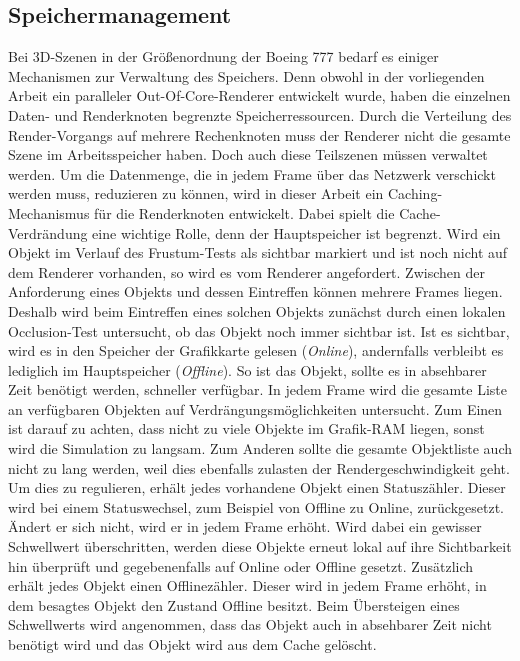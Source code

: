 \subsection{Speichermanagement}
\label{sec:basics:speicher}
Bei 3D-Szenen in der Größenordnung der Boeing 777 bedarf es einiger Mechanismen zur Verwaltung des Speichers. Denn obwohl in der vorliegenden Arbeit ein paralleler Out-Of-Core-Renderer entwickelt wurde, haben die einzelnen Daten- und Renderknoten begrenzte Speicherressourcen. Durch die Verteilung des Render-Vorgangs auf mehrere Rechenknoten muss der Renderer nicht die gesamte Szene im Arbeitsspeicher haben. Doch auch diese Teilszenen müssen verwaltet werden. Um die Datenmenge, die in jedem Frame über das Netzwerk verschickt werden muss, reduzieren zu können, wird in dieser Arbeit ein Caching-Mechanismus für die Renderknoten entwickelt. Dabei spielt die Cache-Verdrändung eine wichtige Rolle, denn der Hauptspeicher ist begrenzt. Wird ein Objekt im Verlauf des Frustum-Tests als sichtbar markiert und ist noch nicht auf dem Renderer vorhanden, so wird es vom Renderer angefordert. Zwischen der Anforderung eines Objekts und dessen Eintreffen können mehrere Frames liegen. Deshalb wird beim Eintreffen eines solchen Objekts zunächst durch einen lokalen Occlusion-Test untersucht, ob das Objekt noch immer sichtbar ist. Ist es sichtbar, wird es in den Speicher der Grafikkarte gelesen (\textit{Online}), andernfalls verbleibt es lediglich im Hauptspeicher (\textit{Offline}). So ist das Objekt, sollte es in absehbarer Zeit benötigt werden, schneller verfügbar. In jedem Frame wird die gesamte Liste an verfügbaren Objekten auf Verdrängungsmöglichkeiten untersucht. Zum Einen ist darauf zu achten, dass nicht zu viele Objekte im Grafik-RAM liegen, sonst wird die Simulation zu langsam. Zum Anderen sollte die gesamte Objektliste auch nicht zu lang werden, weil dies ebenfalls zulasten der Rendergeschwindigkeit geht.\\
Um dies zu regulieren, erhält jedes vorhandene Objekt einen Statuszähler. Dieser wird bei einem Statuswechsel, zum Beispiel von Offline zu Online, zurückgesetzt. Ändert er sich nicht, wird er in jedem Frame erhöht. Wird dabei ein gewisser Schwellwert überschritten, werden diese Objekte erneut lokal auf ihre Sichtbarkeit hin überprüft und gegebenenfalls auf Online oder Offline gesetzt. Zusätzlich erhält jedes Objekt einen Offlinezähler. Dieser wird in jedem Frame erhöht, in dem besagtes Objekt den Zustand Offline besitzt. Beim Übersteigen eines Schwellwerts wird angenommen, dass das Objekt auch in absehbarer Zeit nicht benötigt wird und das Objekt wird aus dem Cache gelöscht.
